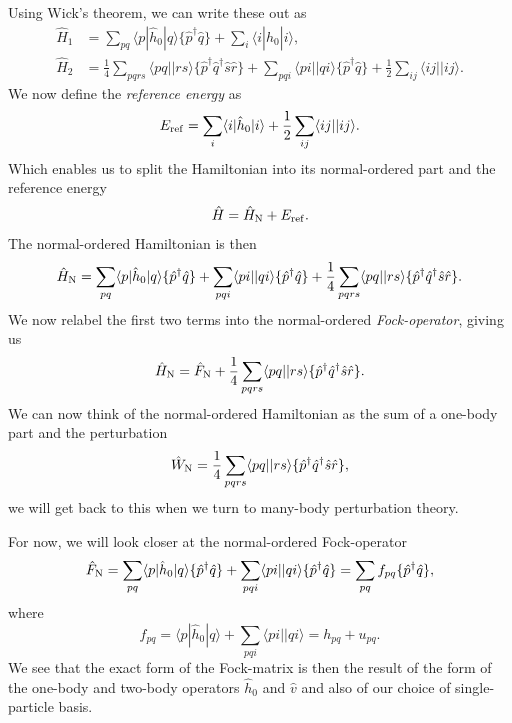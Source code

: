 \documentclass[a4paper, 11pt, notitlepage, english]{article}
\newcommand{\brakket}[2]{\langle #1 || #2 \rangle}
\newcommand{\op}[1]{\hat{#1}}
\newcommand{\braopket}[3]{\langle #1 | {#2} | #3 \rangle}
\begin{document}
Using Wick's theorem, we can write these out as 
\begin{align*}
\op{H}_1 &= \sum_{pq}\braopket{p}{\op{h}_0}{q}\{\op{p}^\dag \op{q}\} + \sum_{i}\braopket{i}{\op{h}_0}{i}, \\
\op{H}_2 &= \frac{1}{4}\sum_{pqrs} \brakket{pq}{rs} \{\op{p}^\dag \op{q}^\dag \op{s}\op{r}\} + \sum_{pqi} \brakket{pi}{qi} \{ \op{p}^\dag \op{q} \} + \frac{1}{2}\sum_{ij} \brakket{ij}{ij}.
\end{align*}
We now define the \emph{reference energy} as
$$E_{\rm ref} = \sum_{i}\braopket{i}{\op{h}_0}{i} + \frac{1}{2}\sum_{ij} \brakket{ij}{ij}.$$
Which enables us to split the Hamiltonian into its normal-ordered part and the reference energy
$$\op{H} = \op{H}_{\rm N} + E_{\rm ref}.$$
The normal-ordered Hamiltonian is then
$$\op{H}_{\rm N} = \sum_{pq}\braopket{p}{\op{h}_0}{q}\{\op{p}^\dag \op{q}\}  + \sum_{pqi} \brakket{pi}{qi}\{\op{p}^\dag \op{q}\}  + \frac{1}{4}\sum_{pqrs} \brakket{pq}{rs} \{\op{p}^\dag \op{q}^\dag \op{s}\op{r}\}.$$
We now relabel the first two terms into the normal-ordered \emph{Fock-operator}, giving us
$$\op{H}_{\rm N} = \op{F}_{\rm N} + \frac{1}{4}\sum_{pqrs} \brakket{pq}{rs} \{\op{p}^\dag \op{q}^\dag \op{s}\op{r}\}.$$
We can now think of the normal-ordered Hamiltonian as the sum of a one-body part and the perturbation
$$\op{W}_{\rm N}  =\frac{1}{4}\sum_{pqrs} \brakket{pq}{rs} \{\op{p}^\dag \op{q}^\dag \op{s}\op{r}\},$$
we will get back to this when we turn to many-body perturbation theory.

\clearpage

For now, we will look closer at the normal-ordered Fock-operator
$$\op{F}_{\rm N} = \sum_{pq}\braopket{p}{\op{h}_0}{q}\{\op{p}^\dag \op{q}\}  + \sum_{pqi} \brakket{pi}{qi} \{\op{p}^\dag \op{q}\} = \sum_{pq} f_{pq} \{\op{p}^\dagger \op{q} \},$$
where
$$f_{pq} = \braopket{p}{\op{h}_0}{q} + \sum_{pqi} \brakket{pi}{qi}  = h_{pq} + u_{pq}.$$
We see that the exact form of the Fock-matrix is then the result of the form of the one-body and two-body operators $\op{h}_0$ and $\op{v}$ and also of our choice of single-particle basis. 
\end{document}
